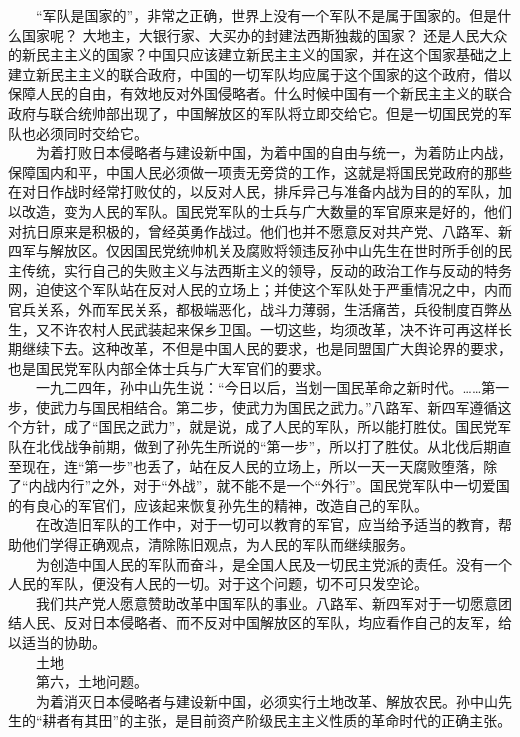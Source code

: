 \documentclass[cn,11pt,chinese]{elegantbook}
\begin{document}
　　“军队是国家的”，非常之正确，世界上没有一个军队不是属于国家的。但是什么国家呢？ 大地主，大银行家、大买办的封建法西斯独裁的国家？ 还是人民大众的新民主主义的国家？中国只应该建立新民主主义的国家，并在这个国家基础之上建立新民主主义的联合政府，中国的一切军队均应属于这个国家的这个政府，借以保障人民的自由，有效地反对外国侵略者。什么时候中国有一个新民主主义的联合政府与联合统帅部出现了，中国解放区的军队将立即交给它。但是一切国民党的军队也必须同时交给它。\\
　　为着打败日本侵略者与建设新中国，为着中国的自由与统一，为着防止内战，保障国内和平，中国人民必须做一项责无旁贷的工作，这就是将国民党政府的那些在对日作战时经常打败仗的，以反对人民，排斥异己与准备内战为目的的军队，加以改造，变为人民的军队。国民党军队的士兵与广大数量的军官原来是好的，他们对抗日原来是积极的，曾经英勇作战过。他们也并不愿意反对共产党、八路军、新四军与解放区。仅因国民党统帅机关及腐败将领违反孙中山先生在世时所手创的民主传统，实行自己的失败主义与法西斯主义的领导，反动的政治工作与反动的特务网，迫使这个军队站在反对人民的立场上；并使这个军队处于严重情况之中，内而官兵关系，外而军民关系，都极端恶化，战斗力薄弱，生活痛苦，兵役制度百弊丛生，又不许农村人民武装起来保乡卫国。一切这些，均须改革，决不许可再这样长期继续下去。这种改革，不但是中国人民的要求，也是同盟国广大舆论界的要求，也是国民党军队内部全体士兵与广大军官们的要求。\\
　　一九二四年，孙中山先生说：“今日以后，当划一国民革命之新时代。……第一步，使武力与国民相结合。第二步，使武力为国民之武力。”八路军、新四军遵循这个方针，成了“国民之武力”，就是说，成了人民的军队，所以能打胜仗。国民党军队在北伐战争前期，做到了孙先生所说的“第一步”，所以打了胜仗。从北伐后期直至现在，连“第一步”也丢了，站在反人民的立场上，所以一天一天腐败堕落，除了“内战内行”之外，对于“外战”，就不能不是一个“外行”。国民党军队中一切爱国的有良心的军官们，应该起来恢复孙先生的精神，改造自己的军队。\\
　　在改造旧军队的工作中，对于一切可以教育的军官，应当给予适当的教育，帮助他们学得正确观点，清除陈旧观点，为人民的军队而继续服务。\\
　　为创造中国人民的军队而奋斗，是全国人民及一切民主党派的责任。没有一个人民的军队，便没有人民的一切。对于这个问题，切不可只发空论。\\
　　我们共产党人愿意赞助改革中国军队的事业。八路军、新四军对于一切愿意团结人民、反对日本侵略者、而不反对中国解放区的军队，均应看作自己的友军，给以适当的协助。\\
　　土地\\
　　第六，土地问题。\\
　　为着消灭日本侵略者与建设新中国，必须实行土地改革、解放农民。孙中山先生的“耕者有其田”的主张，是目前资产阶级民主主义性质的革命时代的正确主张。\\
\end{document}
